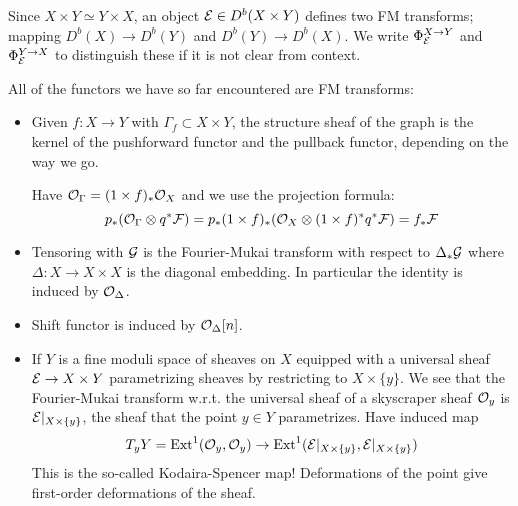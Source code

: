 \begin{remark}{}{}
    Since $X\times Y\simeq Y\times X$, an object $\mathcal{E}\in D^b(X\times Y)$
    defines two FM transforms; mapping $D^b(X)\to D^b(Y)$ and
    $D^b(Y)\to D^b(X)$. We write $\Phi^{X\to Y}_{\mathcal{E}}$ and $\Phi^{Y\to X}_{\mathcal{E}}$
    to distinguish these if it is not clear from context.
\end{remark}

All of the functors we have so far encountered are FM transforms:
\begin{itemize}
    \item Given $f:X\to Y$ with $\Gamma_f\subset X\times Y$, the structure sheaf of the graph is the kernel of the pushforward functor and the pullback functor, depending on the way we go.

    Have $\mathcal{O}_\Gamma=(1\times f)_*\mathcal{O}_X$ and we use the projection formula:
    \begin{equation*}
        p_*(\mathcal{O}_\Gamma\otimes q^*\mathcal{F})
            = p_*(1\times f)_*(\mathcal{O}_X\otimes(1\times f)^*q^*\mathcal{F})
            = f_*\mathcal{F}
    \end{equation*}

    \item Tensoring with $\mathcal{G}$ is the Fourier-Mukai transform with respect to $\Delta_*\mathcal{G}$ where $\Delta:X\to X\times X$ is the diagonal embedding. In particular the identity is induced by $\mathcal{O}_\Delta$.

    \item Shift functor is induced by $\mathcal{O}_\Delta[n]$.

    \item If $Y$ is a fine moduli space of sheaves on $X$ equipped with a universal sheaf $\mathcal{E}\to X\times Y$ parametrizing sheaves by restricting to $X\times\{y\}$. We see that the Fourier-Mukai transform w.r.t. the universal sheaf of a skyscraper sheaf $\mathcal{O}_y$ is $\mathcal{E}|_{X\times\{y\}}$, the sheaf that the point $y\in Y$ parametrizes. Have induced map
        \begin{equation*}
            T_yY
                = \operatorname{Ext}^1(\mathcal{O}_{y},\mathcal{O}_{y})
                \to \operatorname{Ext}^1(\mathcal{E}|_{X\times\{y\}},\mathcal{E}|_{X\times\{y\}})
        \end{equation*}
        This is the so-called Kodaira-Spencer map! Deformations of the point give first-order deformations of the sheaf.
\end{itemize}

